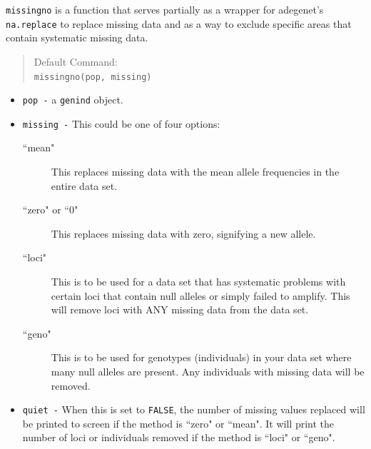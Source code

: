 \documentclass[letterpaper]{article}
\newcommand{\tab}{\hspace*{1em}}
\begin{document}
\tab\tab \texttt{missingno} is a function that serves partially as a wrapper for adegenet's \texttt{na.replace} to replace missing data and as a way to exclude specific areas that contain systematic missing data.  
\begin{quote}
Default Command:\\
\texttt{missingno(pop, missing)}
\end{quote}
\begin{itemize}
  \item \texttt{pop -} a \texttt{genind} object.
  \item \texttt{missing -} This could be one of four options:
    \begin{description}
      \item[ ``mean"] This replaces missing data with the mean allele frequencies in the entire data set.
      \item[ ``zero" or ``0"] This replaces missing data with zero, signifying a new allele.
      \item[ ``loci"] This is to be used for a data set that has systematic problems with certain loci that contain null alleles or simply failed to amplify. This will remove loci with ANY missing data from the data set.
      \item[ ``geno"] This is to be used for genotypes (individuals) in your data set where many null alleles are present. Any individuals with missing data will be removed.
    \end{description}
    \item \texttt{quiet -} When this is set to \texttt{FALSE}, the number of missing values replaced will be printed to screen if the method is ``zero" or ``mean". It will print the number of loci or individuals removed if the method is ``loci" or ``geno".
\end{itemize}
\end{document}
